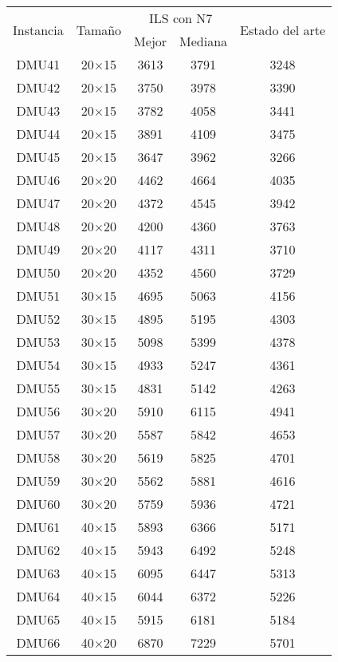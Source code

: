 \begin{table}[H]
\centering
\begin{tabular}{@{}ccccc@{}}
\toprule
\multirow{2}{*}{Instancia} & \multirow{2}{*}{Tamaño} & \multicolumn{2}{c}{ILS con N7} & \multirow{2}{*}{Estado del arte} \\ \cmidrule(lr){3-4}
& & Mejor& Mediana & \\ \midrule
DMU41 & 20$\times$15 & 3613 & 3791 & 3248\\ 
DMU42 & 20$\times$15 & 3750 & 3978 & 3390\\ 
DMU43 & 20$\times$15 & 3782 & 4058 & 3441\\ 
DMU44 & 20$\times$15 & 3891 & 4109 & 3475\\ 
DMU45 & 20$\times$15 & 3647 & 3962 & 3266\\ 
DMU46 & 20$\times$20 & 4462 & 4664 & 4035\\ 
DMU47 & 20$\times$20 & 4372 & 4545 & 3942\\ 
DMU48 & 20$\times$20 & 4200 & 4360 & 3763\\ 
DMU49 & 20$\times$20 & 4117 & 4311 & 3710\\ 
DMU50 & 20$\times$20 & 4352 & 4560 & 3729\\ 
DMU51 & 30$\times$15 & 4695 & 5063 & 4156\\ 
DMU52 & 30$\times$15 & 4895 & 5195 & 4303\\ 
DMU53 & 30$\times$15 & 5098 & 5399 & 4378\\ 
DMU54 & 30$\times$15 & 4933 & 5247 & 4361\\ 
DMU55 & 30$\times$15 & 4831 & 5142 & 4263\\ 
DMU56 & 30$\times$20 & 5910 & 6115 & 4941\\ 
DMU57 & 30$\times$20 & 5587 & 5842 & 4653\\ 
DMU58 & 30$\times$20 & 5619 & 5825 & 4701\\ 
DMU59 & 30$\times$20 & 5562 & 5881 & 4616\\ 
DMU60 & 30$\times$20 & 5759 & 5936 & 4721\\ 
DMU61 & 40$\times$15 & 5893 & 6366 & 5171\\ 
DMU62 & 40$\times$15 & 5943 & 6492 & 5248\\ 
DMU63 & 40$\times$15 & 6095 & 6447 & 5313\\ 
DMU64 & 40$\times$15 & 6044 & 6372 & 5226\\ 
DMU65 & 40$\times$15 & 5915 & 6181 & 5184\\ 
DMU66 & 40$\times$20 & 6870 & 7229 & 5701\\ 

\end{tabular}
\end{table}
